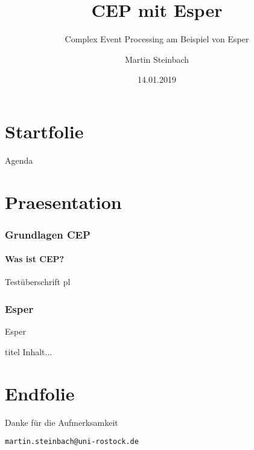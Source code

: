 \documentclass{beamer}
\title{CEP mit Esper}
\subtitle{\Large Complex Event Processing am Beispiel von Esper}
\institute{}
\author{Martin Steinbach}
\date{14.01.2019}
\begin{document}
\part{Startfolie}
\begin{frame}
\titlepage
\end{frame}

\begin{frame}{Agenda}
  
\end{frame}


\part{Praesentation}
\section{Grundlagen CEP}
\subsection{Was ist CEP?}
\begin{frame}{Testüberschrift}
pl
\end{frame}



\section{Esper}
\begin{frame}{Esper}
 \begin{exampleblock}{titel}
   Inhalt...
 \end{exampleblock}
\end{frame}
\part{Endfolie}
\begin{frame}

\framebreak
\begin{center}
\Large \textcolor{red!60}{{Danke für die Aufmerksamkeit}}\\
\vspace{0.5 cm}
\end{center}
\begin{center}

\texttt{\scriptsize martin.steinbach@uni-rostock.de}\\

\end{center}



\end{frame}
\end{document}
